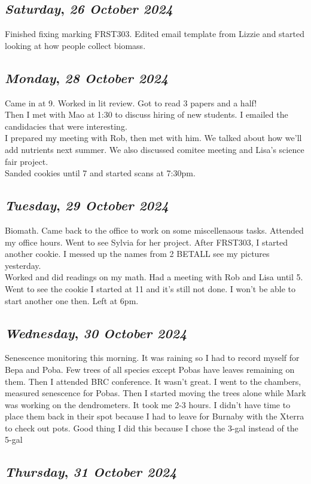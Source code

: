 \def\day{\textit{26 October 2024}}
\def\weekday{\textit{Saturday}}
\subsection*{\weekday, \day}
Finished fixing marking FRST303. Edited email template from Lizzie and started looking at how people collect biomass.

\def\day{\textit{28 October 2024}}
\def\weekday{\textit{Monday}}
\subsection*{\weekday, \day}
Came in at 9. Worked in lit review. Got to read 3 papers and a half! \\
Then I met with Mao at 1:30 to discuss hiring of new students. I emailed the candidacies that were interesting. \\
I prepared my meeting with Rob, then met with him. We talked about how we'll add nutrients next summer. We also discussed comitee meeting and Lisa's science fair project. \\
Sanded cookies until 7 and started scans at 7:30pm.

\def\day{\textit{29 October 2024}}
\def\weekday{\textit{Tuesday}}
\subsection*{\weekday, \day}
Biomath. Came back to the office to work on some miscellenaous tasks. Attended my office hours. Went to see Sylvia for her project. After FRST303, I started another cookie. I messed up the names from 2 BETALL see my pictures yesterday. \\
Worked and did readings on my math. Had a meeting with Rob and Lisa until 5. Went to see the cookie I started at 11 and it's still not done. I won't be able to start another one then. Left at 6pm. 

\def\day{\textit{30 October 2024}}
\def\weekday{\textit{Wednesday}}
\subsection*{\weekday, \day}
Senescence monitoring this morning. It was raining so I had to record myself for Bepa and Poba. Few trees of all species except Pobas have leaves remaining on them. Then I attended BRC conference. It wasn't great. I went to the chambers, measured senescence for Pobas. Then I started moving the trees alone while Mark was working on the dendrometers. It took me 2-3 hours. I didn't have time to place them back in their spot because I had to leave for Burnaby with the Xterra to check out pots. Good thing I did this because I chose the 3-gal instead of the 5-gal

\def\day{\textit{31 October 2024}}
\def\weekday{\textit{Thursday}}
\subsection*{\weekday, \day}
